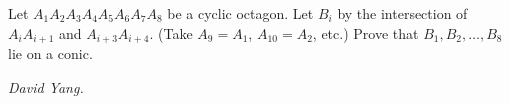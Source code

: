 Let $A_1A_2A_3A_4A_5A_6A_7A_8$ be a cyclic octagon. Let $B_i$ by the intersection of $A_iA_{i+1}$ and $A_{i+3}A_{i+4}$. (Take $A_9 = A_1$, $A_{10} = A_2$, etc.) Prove that $B_1, B_2, \ldots , B_8$ lie on a conic.

\textit{David Yang.}